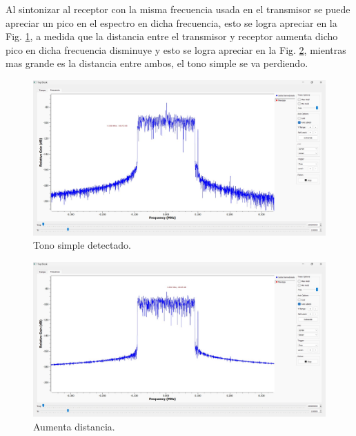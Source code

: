 Al sintonizar al receptor con la misma frecuencia usada en el transmisor se puede apreciar un pico en el espectro en dicha frecuencia, esto se logra apreciar en la Fig. \ref{fig:14_tonoDectectado}, a medida que la distancia entre el transmisor y receptor aumenta dicho pico en dicha frecuencia disminuye y esto se logra apreciar en la Fig. \ref{fig:14_tonoAleajndose}, mientras mas grande es la distancia entre ambos, el tono simple se va perdiendo.

    \begin{figure}[H]
        \centering
        \includegraphics[width=0.9\linewidth]{imagenes/Parte_2/Actividad_14/14_tonoDetectado.jpg}
        \caption{Tono simple detectado.}
        \label{fig:14_tonoDectectado}
    \end{figure}

    \begin{figure}[H]
        \centering
        \includegraphics[width=0.9\linewidth]{imagenes/Parte_2/Actividad_14/14_tonoAlejandose.jpg}
        \caption{Aumenta distancia.}
        \label{fig:14_tonoAleajndose}
    \end{figure}